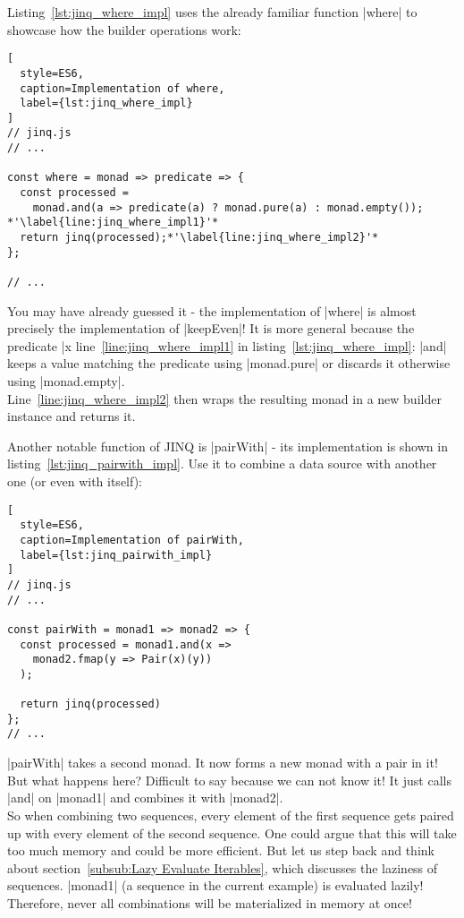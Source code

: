 Listing~\ref{lst:jinq_where_impl} uses the already familiar function |where| to
showcase how the builder operations work:

\begin{lstlisting}[
  style=ES6,
  caption=Implementation of where,
  label={lst:jinq_where_impl}
]
// jinq.js
// ...

const where = monad => predicate => {
  const processed = 
    monad.and(a => predicate(a) ? monad.pure(a) : monad.empty()); *'\label{line:jinq_where_impl1}'*
  return jinq(processed);*'\label{line:jinq_where_impl2}'*
};

// ...
\end{lstlisting}

You may have already guessed it - the implementation of |where| is almost
precisely the implementation of |keepEven|! It is more general because the
predicate |x %
line~\ref{line:jinq_where_impl1} in listing~\ref{lst:jinq_where_impl}: |and|
keeps a value matching the predicate using |monad.pure| or discards it
otherwise using |monad.empty|.\\
Line~\ref{line:jinq_where_impl2} then wraps the resulting monad in a new
builder instance and returns it.

Another notable function of JINQ is |pairWith| - its implementation is shown in
listing~\ref{lst:jinq_pairwith_impl}. Use it to combine a data source with
another one (or even with itself):

\begin{lstlisting}[
  style=ES6,
  caption=Implementation of pairWith,
  label={lst:jinq_pairwith_impl}
]
// jinq.js
// ...

const pairWith = monad1 => monad2 => {
  const processed = monad1.and(x =>
    monad2.fmap(y => Pair(x)(y))
  );

  return jinq(processed)
};
// ...
\end{lstlisting}

|pairWith| takes a second monad. It now forms a new monad with a pair in it!
But what happens here? Difficult to say because we can not know it! It just
calls |and| on |monad1| and combines it with |monad2|. \\
So when combining two sequences, every element of the first sequence gets
paired up with every element of the second sequence. One could argue that this
will take too much memory and could be more efficient. But let us step back and
think about section~\ref{subsub:Lazy Evaluate Iterables}, which discusses the laziness of sequences. |monad1|
(a sequence in the current example) is evaluated lazily! Therefore, never all
combinations will be materialized in memory at once!

